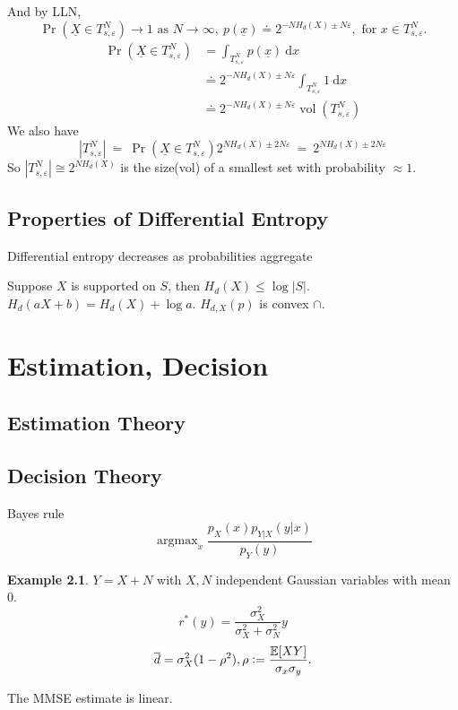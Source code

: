 \documentclass{report}
\newcommand{\matE}{\mathbb{E}}
\newcommand{\idf}{\ \mathrm{d}}
\newcommand{\ddoteq}{\ \ddot{=}\ }
\DeclareMathOperator*{\argmax}{\arg \max}
\newcommand{\defeq}{\vcentcolon=}
\theoremstyle{definition}
\newtheorem{example}{Example}[section]
\theoremstyle{remark}
\numberwithin{equation}{section}
\begin{document}
And by LLN, \[
\Pr(\underline{X} \in T_{s,\varepsilon}^N) \to 1 \text{ as } N \to \infty,\ p(\underline{x}) \doteq 2^{-NH_d(X)\pm N\varepsilon}, \text{ for } x \in T_{s, \varepsilon}^N.
\]
\begin{align*}
  \Pr\left(\underline{X} \in T_{s,\varepsilon}^N\right) & = \int_{T_{s, \varepsilon}^N}p(\underline{x}) \idf x \\
  & \doteq 2^{-NH_d(X)\pm N\varepsilon} \int_{T_{s, \varepsilon}^N} 1 \idf x \\
  & \doteq 2^{-NH_d(X)\pm N\varepsilon} \operatorname{vol}(T_{s, \varepsilon}^N)
\end{align*}
We also have \[|T_{s,\varepsilon}^N| \ddoteq \Pr(\underline{X} \in T_{s, \varepsilon}^N)2^{NH_d(X)\pm2N\varepsilon}\ddoteq 2^{NH_d(X)\pm2N\varepsilon}\]
So \(|T_{s,\varepsilon}^N| \cong 2^{NH_d(X)}\) is the size(vol) of a smallest set with probability $\approx 1$.

\section{Properties of Differential Entropy}

Differential entropy decreases as probabilities aggregate

Suppose $X$ is supported on $S$, then $H_d(X) \leq \log |S|$.
$H_{d}(aX+b) = H_d(X) + \log a$.
$H_{d, X}(p)$ is convex $\cap$.

\chapter{Estimation, Decision}

\section{Estimation Theory}



\section{Decision Theory}


Bayes rule \[\argmax_x \frac{p_X(x)p_{Y|X}(y|x)}{p_Y(y)}\]

\begin{example}
  $Y = X + N$ with $X, N$ independent Gaussian variables with mean $0$.
  \[r^*(y) = \frac{\sigma_X^2}{\sigma_X^2+\sigma_N^2}y\]
  \[\overline{d} = \sigma_X^2(1 - \rho^2), \rho \defeq \frac{\matE[XY]}{\sigma_x\sigma_y}.\]
\end{example}
The MMSE estimate is linear.
\end{document}
